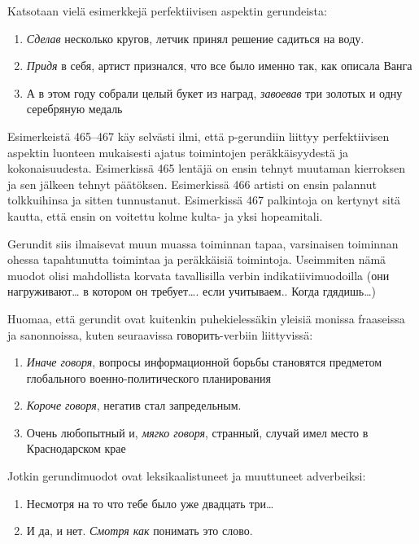 \documentclass[]{scrreprt}
\providecommand{\tightlist}{%
  \setlength{\itemsep}{0pt}\setlength{\parskip}{0pt}}
\begin{document}
Katsotaan vielä esimerkkejä perfektiivisen aspektin gerundeista:

\begin{enumerate}
\def\labelenumi{(\arabic{enumi})}
\setcounter{enumi}{464}
\tightlist
\item
  \emph{Сделав} несколько кругов, летчик принял решение садиться на
  воду.
\item
  \emph{Придя} в себя, артист признался, что все было именно так, как
  описала Ванга
\item
  А в этом году собрали целый букет из наград, \emph{завоевав} три
  золотых и одну серебряную медаль
\end{enumerate}

Esimerkeistä 465--467 käy selvästi ilmi, että p-gerundiin liittyy
perfektiivisen aspektin luonteen mukaisesti ajatus toimintojen
peräkkäisyydestä ja kokonaisuudesta. Esimerkissä 465 lentäjä on ensin
tehnyt muutaman kierroksen ja sen jälkeen tehnyt päätöksen. Esimerkissä
466 artisti on ensin palannut tolkkuihinsa ja sitten tunnustanut.
Esimerkissä 467 palkintoja on kertynyt sitä kautta, että ensin on
voitettu kolme kulta- ja yksi hopeamitali.

Gerundit siis ilmaisevat muun muassa toiminnan tapaa, varsinaisen
toiminnan ohessa tapahtunutta toimintaa ja peräkkäisiä toimintoja.
Useimmiten nämä muodot olisi mahdollista korvata tavallisilla verbin
indikatiivimuodoilla (они нагруживают\ldots{} в котором он
требует\ldots{}. если учитываем.. Когда гдядишь\ldots{})

Huomaa, että gerundit ovat kuitenkin puhekielessäkin yleisiä monissa
fraaseissa ja sanonnoissa, kuten seuraavissa говорить-verbiin
liittyvissä:

\begin{enumerate}
\def\labelenumi{(\arabic{enumi})}
\setcounter{enumi}{467}
\tightlist
\item
  \emph{Иначе говоря}, вопросы информационной борьбы становятся
  предметом глобального военно-политического планирования
\item
  \emph{Короче говоря}, негатив стал запредельным.
\item
  Очень любопытный и, \emph{мягко говоря}, странный, случай имел место в
  Краснодарском крае
\end{enumerate}

Jotkin gerundimuodot ovat leksikaalistuneet ja muuttuneet adverbeiksi:

\begin{enumerate}
\def\labelenumi{(\arabic{enumi})}
\setcounter{enumi}{470}
\tightlist
\item
  Несмотря на то что тебе было уже двадцать три\ldots{}
\item
  И да, и нет. \emph{Смотря как} понимать это слово.
\end{enumerate}
\end{document}
